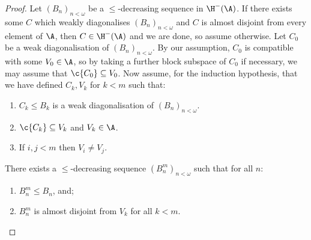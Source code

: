 \documentclass[11pt,reqno]{amsart}
\begin{document}
\begin{proof}
    Let $(B_n)_{n<\omega}$ be a $\leq$-decreasing sequence in $\H^-(\A)$. If there exists some $C$ which weakly diagonalises $(B_n)_{n<\omega}$ and $C$ is almost disjoint from every element of $\A$, then $C \in \H^-(\A)$ and we are done, so assume otherwise. Let $C_0$ be a weak diagonalisation of $(B_n)_{n<\omega}$. By our assumption, $C_0$ is compatible with some $V_0 \in \A$, so by taking a further block subspace of $C_0$ if necessary, we may assume that $\c{C_0} \subseteq V_0$. Now assume, for the induction hypothesis, that we have defined $C_k,V_k$ for $k < m$ such that:
    \begin{enumerate}
        \item $C_k \leq B_k$ is a weak diagonalisation of $(B_n)_{n<\omega}$.

        \item $\c{C_k} \subseteq V_k$ and $V_k \in \A$.

        \item If $i,j < m$ then $V_i \neq V_j$.
    \end{enumerate}

    \begin{claim}
        There exists a $\leq$-decreasing sequence $(B_n^m)_{n<\omega}$ such that for all $n$:
        \begin{enumerate}
            \item $B_n^m \leq B_n$, and;

            \item $B_n^m$ is almost disjoint from $V_k$ for all $k < m$.
        \end{enumerate}
    \end{claim}


\end{proof}
\end{document}
